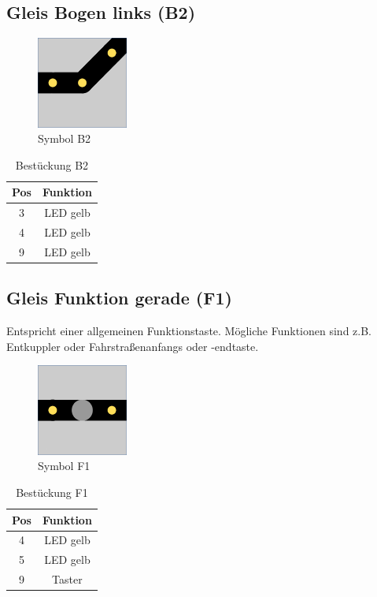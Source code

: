 \documentclass[10pt,a4paper]{article}
\begin{document}
\subsection{Gleis Bogen links (B2)}
\begin{figure}[H]
\centering
\includegraphics[width=3cm]{../folien/b2.png}
\caption{Symbol B2}
\end{figure}
\begin{table}[h!]
\centering
\begin{tabular}{c|c}
\textbf{Pos} & \textbf{Funktion} \\ \hline
3 & LED gelb \\
4 & LED gelb \\
9 & LED gelb
\end{tabular}
\caption{Bestückung B2}
\end{table}
\newpage
\subsection{Gleis Funktion gerade (F1)}
Entspricht einer allgemeinen Funktionstaste. Mögliche Funktionen sind z.B. Entkuppler oder Fahrstraßenanfangs oder -endtaste.
\begin{figure}[hbtp]
\centering
\includegraphics[width=3cm]{../folien/f1.png}
\caption{Symbol F1}
\end{figure}
\begin{table}[h!]
\centering
\begin{tabular}{c|c}
\textbf{Pos} & \textbf{Funktion} \\ \hline
4 & LED gelb \\
5 & LED gelb \\
9 & Taster
\end{tabular}
\caption{Bestückung F1}
\end{table}
\end{document}
